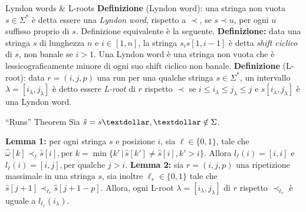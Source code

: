 \documentclass{beamer}
\begin{document}
    \begin{frame}{Lyndon words \&  L-roots}
        \textbf{Definizione} (Lyndon word): una stringa non vuota \(s \in \Sigma^{*}\)
        è detta essere una \emph{Lyndon word}, rispetto a \(\prec\), 
        se \(s \prec u\), per ogni \(u\) suffisso proprio di \(s\).
        \vskip 5pt
         Definizione equivalente è la seguente.
        \vskip 5pt
        \textbf{Definizione: } data una stringa \(s\) di lunghezza \(n\) e 
        \(i \in [1, n]\), la stringa \(s_{i}s[1, i - 1]\) è detta 
        \emph{shift ciclico} di \(s\), non banale se \(i > 1\).
        Una Lyndon word è una stringa non vuota che è lessicograficamente minore
        di ogni suo shift ciclico non banale.
        \vskip 10pt 
        \textbf{Definizione} (L-root): data \(r = (i, j, p)\) una run per una 
        qualche stringa \(s \in \Sigma^{*}\),
        un intervallo \(\lambda = [i_{\lambda}, j_{\lambda}]\) è detto essere
        \emph{L-root} di \(r\) rispetto \(\prec\) se 
        \(i \le i_{\lambda} \le j_{\lambda} \le j\)
        e \(s[i_{\lambda}, j_{\lambda}]\) è una Lyndon word.
    \end{frame}

    \begin{frame}{``Runs'' Theorem}
        Sia \(\hat{s} = s\textdollar, \textdollar \notin \Sigma\).

        \textbf{Lemma 1:} per ogni stringa \(s\) e posizione \(i\),
        sia \(\ell \in \{0, 1\} \), tale che \(\hat{\omega}[k] \prec_{\ell} 
        \hat{s}[i], \text{per } k = \min \{ k' \, \vert \, \hat{s}[k'] \ne 
        \hat{s}[i], k' > i\}\). Allora \(l_{\ell}(i) = [i, i]\) e 
        \(l_{\overline{\ell}}(i) = [i, j], \text{per qualche } j > i\).
        \vskip 10pt 
        \textbf{Lemma 2: } sia \(r = (i, j, p)\) una ripetizione massimale in una stringa
        \(s\), sia inoltre \(\ell_{r} \in \{0, 1\}\) tale che 
        \(\hat{s}[j + 1] \prec_{\ell_{r}} \hat{s}[j + 1 -p]\).
        Allora, ogni L-root \(\lambda = [i_{\lambda}, j_{\lambda}]\) di \(r\)
        rispetto \(\prec_{\ell_{r}}\) è uguale a \(l_{\ell_{r}}(i_{\lambda})\).
   \end{frame}
\end{document}
